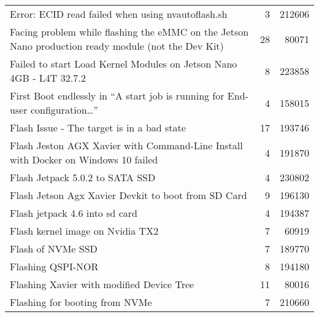 \begin{longtable}{p{}rr}
    Error: ECID read failed when using nvautoflash.sh                                                                                  & 3       & 212606 \\
    Facing problem while flashing the eMMC on the Jetson Nano production ready module (not the Dev Kit)                                & 28      & 80071  \\
    Failed to start Load Kernel Modules on Jetson Nano 4GB - L4T 32.7.2                                                                & 8       & 223858 \\
    First Boot endlessly in “A start job is running for End-user configuration…”                                                       & 4       & 158015 \\
    Flash Issue - The target is in a bad state                                                                                         & 17      & 193746 \\
    Flash Jeston AGX Xavier with Command-Line Install with Docker on Windows 10 failed                                                 & 4       & 191870 \\
    Flash Jetpack 5.0.2 to SATA SSD                                                                                                    & 4       & 230802 \\
    Flash Jetson Agx Xavier Devkit to boot from SD Card                                                                                & 9       & 196130 \\
    Flash jetpack 4.6 into sd card                                                                                                     & 4       & 194387 \\
    Flash kernel image on Nvidia TX2                                                                                                   & 7       & 60919  \\
    Flash of NVMe SSD                                                                                                                  & 7       & 189770 \\
    Flashing QSPI-NOR                                                                                                                  & 8       & 194180 \\
    Flashing Xavier with modified Device Tree                                                                                          & 11      & 80016  \\
    Flashing for booting from NVMe                                                                                                     & 7       & 210660 \\

\end{longtable}
